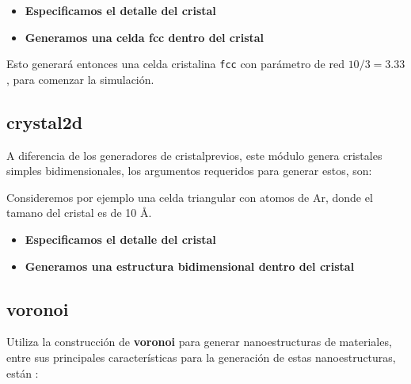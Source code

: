 \begin{itemize}
 \item \textbf{Especificamos el detalle del cristal}
 \item \textbf{Generamos una celda  fcc dentro del cristal}
\end{itemize}

Esto generar\'a entonces una celda cristalina \verb|fcc| con par\'ametro de red $10/3 = 3.33$, para comenzar la simulaci\'on.

\subsection{crystal2d}
A diferencia de los generadores de cristalprevios, este m\'odulo genera cristales simples bidimensionales, los argumentos requeridos para generar estos, son:


Consideremos por ejemplo una celda triangular con atomos de Ar, donde el tamano del cristal es de 10 \AA.

\begin{itemize}
 \item \textbf{Especificamos el detalle del cristal}
 \item \textbf{Generamos una estructura bidimensional dentro del cristal}
\end{itemize}

\subsection{voronoi}
Utiliza la construcci\'on de \textbf{voronoi} para generar nanoestructuras de materiales, entre sus principales caracter\'isticas para la generaci\'on de estas nanoestructuras, est\'an :

